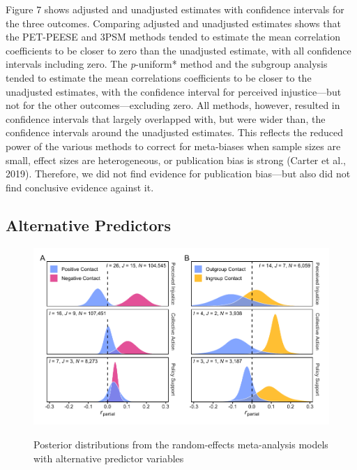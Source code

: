 \documentclass[twocolumn, 11pt, letterpaper]{article}
\begin{document}
Figure 7 shows adjusted and unadjusted estimates with confidence
intervals for the three outcomes. Comparing adjusted and unadjusted
estimates shows that the PET-PEESE and 3PSM methods tended to estimate
the mean correlation coefficients to be closer to zero than the
unadjusted estimate, with all confidence intervals including zero. The
\emph{p}-uniform* method and the subgroup analysis tended to estimate
the mean correlations coefficients to be closer to the unadjusted
estimates, with the confidence interval for perceived injustice---but
not for the other outcomes---excluding zero. All methods, however,
resulted in confidence intervals that largely overlapped with, but were
wider than, the confidence intervals around the unadjusted estimates.
This reflects the reduced power of the various methods to correct for
meta-biases when sample sizes are small, effect sizes are heterogeneous,
or publication bias is strong (Carter et al., 2019). Therefore, we did
not find evidence for publication bias---but also did not find
conclusive evidence against it.

\hypertarget{alternative-predictors}{%
\subsection{Alternative Predictors}\label{alternative-predictors}}

\begin{figure}
\centering
\caption{Posterior distributions from the random-effects meta-analysis models with alternative predictor variables}
\includegraphics[scale=1]{../figures/figure-8}
\label{fig:f8}
\end{figure}
\end{document}
